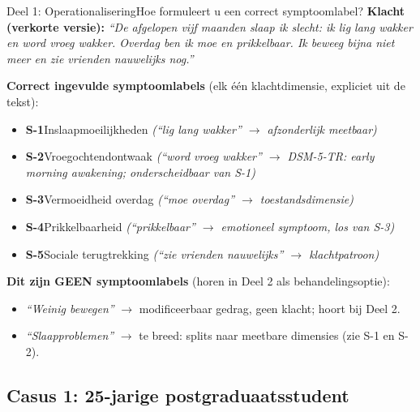 \documentclass[11pt,a4paper]{article}
\begin{document}
\begin{voorbeeldbox}{Deel 1: Operationalisering}{Hoe formuleert u een correct symptoomlabel?}
\small
\textbf{Klacht (verkorte versie):} \textit{``De afgelopen vijf maanden slaap ik slecht:
ik lig lang wakker en word vroeg wakker. Overdag ben ik moe en prikkelbaar. Ik beweeg
bijna niet meer en zie vrienden nauwelijks nog.''}

\medskip
\textbf{Correct ingevulde symptoomlabels} (elk één klachtdimensie, expliciet uit de tekst):
\begin{itemize}[topsep=2pt,itemsep=1pt]
\item \textbf{S-1}\enspace Inslaapmoeilijkheden
  \hfill\textit{(``lig lang wakker'' $\rightarrow$ afzonderlijk meetbaar)}
\item \textbf{S-2}\enspace Vroegochtendontwaak
  \hfill\textit{(``word vroeg wakker'' $\rightarrow$ DSM-5-TR: early morning awakening; onderscheidbaar van S-1)}
\item \textbf{S-3}\enspace Vermoeidheid overdag
  \hfill\textit{(``moe overdag'' $\rightarrow$ toestandsdimensie)}
\item \textbf{S-4}\enspace Prikkelbaarheid
  \hfill\textit{(``prikkelbaar'' $\rightarrow$ emotioneel symptoom, los van S-3)}
\item \textbf{S-5}\enspace Sociale terugtrekking
  \hfill\textit{(``zie vrienden nauwelijks'' $\rightarrow$ klachtpatroon)}
\end{itemize}

\medskip
\textbf{\color{StrongRed}Dit zijn GEEN symptoomlabels} (horen in Deel 2 als behandelingsoptie):
\begin{itemize}[topsep=1pt,itemsep=0pt]
\item \textit{``Weinig bewegen''} $\rightarrow$ modificeerbaar gedrag, geen klacht; hoort bij Deel 2.
\item \textit{``Slaapproblemen''} $\rightarrow$ te breed: splits naar meetbare dimensies (zie S-1 en S-2).
\end{itemize}
\end{voorbeeldbox}

\vspace{0.5em}

\newpage

\subsection*{Casus 1: 25-jarige postgraduaatsstudent}
\end{document}

